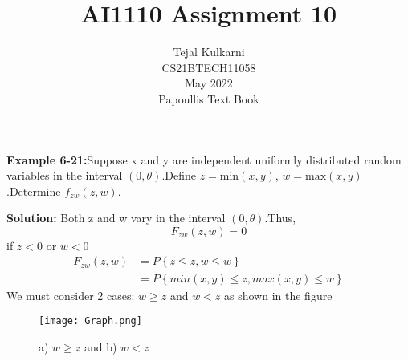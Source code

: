 \documentclass[journal,12pt,two column]{IEEEtran}
\title{AI1110 Assignment 10 }
\author{Tejal Kulkarni \\ CS21BTECH11058 \\\vspace*{20pt} May 2022 \\  Papoullis Text Book }
\newcommand*{\permcomb}[4][0mu]{{{}^{#3}\mkern#1#2_{#4}}}
\begin{document}
\maketitle

\newcommand{\solution}{\noindent \textbf{Solution: }}
\providecommand{\pr}[1]{\ensuremath{\Pr\left(#1\right)}}
\providecommand{\cdf}[2]{\ensuremath{\text{F}_{#1}\left(#2\right)}}
\providecommand{\qfunc}[1]{\ensuremath{Q\left(#1\right)}}
\providecommand{\sbrak}[1]{\ensuremath{{}\left[#1\right]}}
\providecommand{\lsbrak}[1]{\ensuremath{{}\left[#1\right.}}
\providecommand{\rsbrak}[1]{\ensuremath{{}\left.#1\right]}}
\providecommand{\brak}[1]{\ensuremath{\left(#1\right)}}
\providecommand{\lbrak}[1]{\ensuremath{\left(#1\right.}}
\providecommand{\rbrak}[1]{\ensuremath{\left.#1\right)}}
\providecommand{\cbrak}[1]{\ensuremath{\left\{#1\right\}}}
\providecommand{\lcbrak}[1]{\ensuremath{\left\{#1\right.}}
\newcommand*{\comb}[1][-1mu]{\permcomb[#1]{C}}
\renewcommand{\thetable}{\arabic{table}}
\providecommand{\rcbrak}[1]{\ensuremath{\left.#1\right\}}}


\textbf{Example 6-21:}Suppose x and y are independent uniformly distributed random variables in the interval $\brak{0,\theta}$.Define $z = \text{min}(x, y)$, $w = \text{max}(x, y)$.Determine $f_{zw}\brak{z,w}$.

\solution
Both z and w vary in the interval \brak{0,\theta}.Thus,
\begin{equation}
 F_{zw}\brak{z,w} = 0    
\end{equation}
if $z < 0$ or $w < 0$
\begin{align}
   F_{zw}\brak{z,w} &= P\cbrak{z \leq z , w \leq w} \\
                    &=  P\cbrak{min(x,y) \leq z, max (x, y) \leq w} 
\end{align}
We must consider 2 cases: $w \geq z$ and $w < z$ as shown in the figure
\begin{figure}[!ht]
\texttt{[image: Graph.png]}
\caption{a) $w\geq z$ and b) $w < z$}
\label{Fig 1}
\end{figure}
\end{document}
